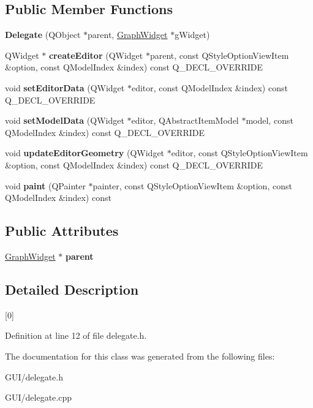 \subsection*{Public Member Functions}
\begin{DoxyCompactItemize}
\item 
\mbox{\label{class_delegate_a29d5e159167780e4ef4c393e99f84059}} 
{\bfseries Delegate} (Q\+Object $\ast$parent, \hyperlink{class_graph_widget}{Graph\+Widget} $\ast$g\+Widget)
\item 
\mbox{\label{class_delegate_a7de3c8d443dc2722a74f64ef9ffee8f9}} 
Q\+Widget $\ast$ {\bfseries create\+Editor} (Q\+Widget $\ast$parent, const Q\+Style\+Option\+View\+Item \&option, const Q\+Model\+Index \&index) const Q\+\_\+\+D\+E\+C\+L\+\_\+\+O\+V\+E\+R\+R\+I\+DE
\item 
\mbox{\label{class_delegate_a1e77e821465701d6f2652c894704a332}} 
void {\bfseries set\+Editor\+Data} (Q\+Widget $\ast$editor, const Q\+Model\+Index \&index) const Q\+\_\+\+D\+E\+C\+L\+\_\+\+O\+V\+E\+R\+R\+I\+DE
\item 
\mbox{\label{class_delegate_affd7318bb201aee7bec15365d907bdb3}} 
void {\bfseries set\+Model\+Data} (Q\+Widget $\ast$editor, Q\+Abstract\+Item\+Model $\ast$model, const Q\+Model\+Index \&index) const Q\+\_\+\+D\+E\+C\+L\+\_\+\+O\+V\+E\+R\+R\+I\+DE
\item 
\mbox{\label{class_delegate_accf606570c4e712154c69116cd103da0}} 
void {\bfseries update\+Editor\+Geometry} (Q\+Widget $\ast$editor, const Q\+Style\+Option\+View\+Item \&option, const Q\+Model\+Index \&index) const Q\+\_\+\+D\+E\+C\+L\+\_\+\+O\+V\+E\+R\+R\+I\+DE
\item 
\mbox{\label{class_delegate_aa0cd2ab8835da9babcce38a1a8210375}} 
void {\bfseries paint} (Q\+Painter $\ast$painter, const Q\+Style\+Option\+View\+Item \&option, const Q\+Model\+Index \&index) const
\end{DoxyCompactItemize}
\subsection*{Public Attributes}
\begin{DoxyCompactItemize}
\item 
\mbox{\label{class_delegate_a44d6295e2ce684f426c5344bbcfb788e}} 
\hyperlink{class_graph_widget}{Graph\+Widget} $\ast$ {\bfseries parent}
\end{DoxyCompactItemize}


\subsection{Detailed Description}
\mbox{[}0\mbox{]} 

Definition at line 12 of file delegate.\+h.



The documentation for this class was generated from the following files\+:\begin{DoxyCompactItemize}
\item 
G\+U\+I/delegate.\+h\item 
G\+U\+I/delegate.\+cpp\end{DoxyCompactItemize}
